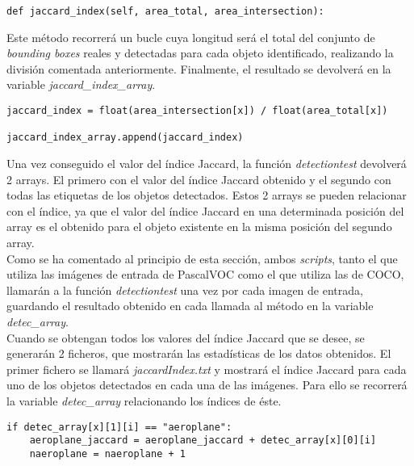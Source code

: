 \documentclass[a4paper, 12pt, oneside]{book}
\begin{document}
\begin{lstlisting}[frame=single]
def jaccard_index(self, area_total, area_intersection):
\end{lstlisting}

Este método recorrerá un bucle cuya longitud será el total del conjunto de \textit{bounding boxes} reales y detectadas para cada objeto identificado, realizando la división comentada anteriormente. Finalmente, el resultado se devolverá en la variable \textit{jaccard\_index\_array}.\\

\begin{lstlisting}[frame=single]
jaccard_index = float(area_intersection[x]) / float(area_total[x])

jaccard_index_array.append(jaccard_index)
\end{lstlisting}

Una vez conseguido el valor del índice Jaccard, la función \textit{detectiontest} devolverá 2 arrays. El primero con el valor del índice Jaccard obtenido y el segundo con todas las etiquetas de los objetos detectados. Estos 2 arrays se pueden relacionar con el índice, ya que el valor del índice Jaccard en una determinada posición del array es el obtenido para el objeto existente en la misma posición del segundo array.\\

Como se ha comentado al principio de esta sección, ambos \textit{scripts}, tanto el que utiliza las imágenes de entrada de PascalVOC como el que utiliza las de COCO, llamarán a la función \textit{detectiontest} una vez por cada imagen de entrada, guardando el resultado obtenido en cada llamada al método en la variable \textit{detec\_array}.\\

Cuando se obtengan todos los valores del índice Jaccard que se desee, se generarán 2 ficheros, que mostrarán las estadísticas de los datos obtenidos. El primer fichero se llamará \textit{jaccardIndex.txt} y mostrará el índice Jaccard para cada uno de los objetos detectados en cada una de las imágenes. Para ello se recorrerá la variable \textit{detec\_array} relacionando los índices de éste.\\

\begin{lstlisting}[frame=single]
if detec_array[x][1][i] == "aeroplane":
	aeroplane_jaccard = aeroplane_jaccard + detec_array[x][0][i]
	naeroplane = naeroplane + 1
\end{lstlisting}
\end{document}
